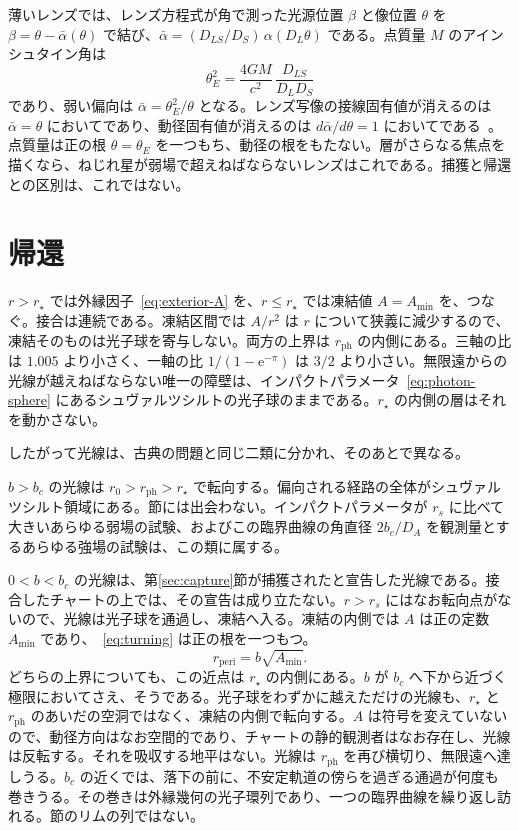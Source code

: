 \documentclass[a4paper]{article}
\begin{document}
薄いレンズでは、レンズ方程式が角で測った光源位置 \(\beta\) と像位置 \(\theta\) を \(\beta=\theta-\bar\alpha(\theta)\) で結び、\(\bar\alpha=(D_{LS}/D_S)\,\alpha(D_L\theta)\) である。点質量 \(M\) のアインシュタイン角は
\begin{equation}
\label{eq:einstein}
\theta_E^2=\frac{4GM}{c^2}\,\frac{D_{LS}}{D_L D_S}
\end{equation}
であり、弱い偏向は \(\bar\alpha=\theta_E^2/\theta\) となる。レンズ写像の接線固有値が消えるのは \(\bar\alpha=\theta\) においてであり、動径固有値が消えるのは \(d\bar\alpha/d\theta=1\) においてである~\cite{NarayanBartelmann1996}。点質量は正の根 \(\theta=\theta_E\) を一つもち、動径の根をもたない。層がさらなる焦点を描くなら、ねじれ星が弱場で超えねばならないレンズはこれである。捕獲と帰還との区別は、これではない。

\section{帰還}
\label{sec:return}

\(r>r_\star\) では外縁因子~\eqref{eq:exterior-A} を、\(r\le r_\star\) では凍結値 \(A=A_{\min}\) を、つなぐ。接合は連続である。凍結区間では \(A/r^2\) は \(r\) について狭義に減少するので、凍結そのものは光子球を寄与しない。両方の上界は \(r_{\mathrm{ph}}\) の内側にある。三軸の比は \(1.005\) より小さく、一軸の比 \(1/(1-\mathrm{e}^{-\pi})\) は \(3/2\) より小さい。無限遠からの光線が越えねばならない唯一の障壁は、インパクトパラメータ~\eqref{eq:photon-sphere} にあるシュヴァルツシルトの光子球のままである。\(r_\star\) の内側の層はそれを動かさない。

したがって光線は、古典の問題と同じ二類に分かれ、そのあとで異なる。

\(b>b_c\) の光線は \(r_0>r_{\mathrm{ph}}>r_\star\) で転向する。偏向される経路の全体がシュヴァルツシルト領域にある。節には出会わない。インパクトパラメータが \(r_s\) に比べて大きいあらゆる弱場の試験、およびこの臨界曲線の角直径 \(2b_c/D_A\) を観測量とするあらゆる強場の試験は、この類に属する。

\(0<b<b_c\) の光線は、第\ref{sec:capture}節が捕獲されたと宣告した光線である。接合したチャートの上では、その宣告は成り立たない。\(r>r_s\) にはなお転向点がないので、光線は光子球を通過し、凍結へ入る。凍結の内側では \(A\) は正の定数 \(A_{\min}\) であり、~\eqref{eq:turning} は正の根を一つもつ。
\begin{equation}
\label{eq:periapsis}
r_{\mathrm{peri}}=b\sqrt{A_{\min}}.
\end{equation}
どちらの上界についても、この近点は \(r_\star\) の内側にある。\(b\) が \(b_c\) へ下から近づく極限においてさえ、そうである。光子球をわずかに越えただけの光線も、\(r_\star\) と \(r_{\mathrm{ph}}\) のあいだの空洞ではなく、凍結の内側で転向する。\(A\) は符号を変えていないので、動径方向はなお空間的であり、チャートの静的観測者はなお存在し、光線は反転する。それを吸収する地平はない。光線は \(r_{\mathrm{ph}}\) を再び横切り、無限遠へ達しうる。\(b_c\) の近くでは、落下の前に、不安定軌道の傍らを過ぎる通過が何度も巻きうる。その巻きは外縁幾何の光子環列であり、一つの臨界曲線を繰り返し訪れる。節のリムの列ではない。
\end{document}
